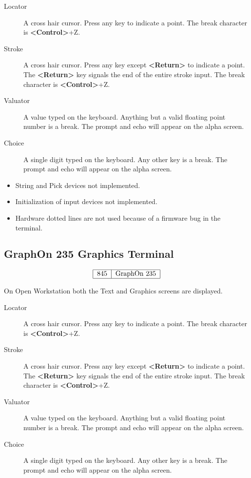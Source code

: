 \documentclass[11pt]{article}
\newcommand{\key}[1]{\fbox{#1}}
\renewcommand{\key}[1]{{\bf<#1>}}
\begin{document}

\begin{description}
\item[Locator] A cross hair cursor.
Press any key to indicate a point.
The break character is \key{Control}+Z.
\item[Stroke] A cross hair cursor.
Press any key except \key{Return} to indicate a point.
The \key{Return} key signals the end of the entire stroke input.
The break character is \key{Control}+Z.
\item[Valuator] A value typed on the keyboard.
Anything but a valid floating point number is a break.
The prompt and echo will appear on the alpha screen.
\item[Choice] A single digit typed on the keyboard.
Any other key is a break.
The prompt and echo will appear on the alpha screen.
\end{description}


\begin{itemize}
\item String and Pick devices not implemented.
\item Initialization of input devices not implemented.
\item Hardware dotted lines are not used because of a firmware bug in the
terminal.
\end{itemize}

\subsection{GraphOn 235 Graphics Terminal}
\label{gragt}


\[\begin{tabular}{|l|l|}\hline
845 &GraphOn 235\\\hline
\end{tabular}\]


On Open Workstation both the Text and Graphics screens are displayed.


\begin{description}
\item[Locator] A cross hair cursor.
Press any key to indicate a point.
The break character is \key{Control}+Z.
\item[Stroke] A cross hair cursor.
Press any key except \key{Return} to indicate a point.
The \key{Return} key signals the end of the entire stroke input.
The break character is \key{Control}+Z.
\item[Valuator] A value typed on the keyboard.
Anything but a valid floating point number is a break.
The prompt and echo will appear on the alpha screen.
\item[Choice] A single digit typed on the keyboard.
Any other key is a break.
The prompt and echo will appear on the alpha screen.
\end{description}
\end{document}
